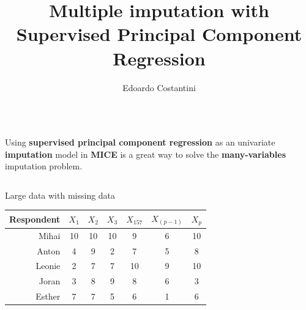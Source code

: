 \documentclass{beamer}\usepackage[]{graphicx}\usepackage[]{xcolor}
\author[e.costantini@tilburgunviersity.com]{Edoardo Costantini}
\title{Multiple imputation with Supervised Principal Component Regression}
\institute{Tilburg University}
\newenvironment{knitrout}{}{} %
\begin{document}


\begin{frame}[fragile]\centering


\begin{columns}
  \begin{column}{.92\textwidth}

    \begin{block}{}
      Using \textbf{supervised principal component regression} as an univariate \textbf{imputation} model in \textbf{MICE} is a great way to solve the \textbf{many-variables} imputation problem.
      \end{block}
    
  \end{column}  
  \end{columns}

  \bigskip
  {\hrulefill}
  \bigskip


\begin{columns}[T]

\begin{column}{.46\textwidth}

\begin{block}{Large data with missing data}
\begin{knitrout}
\color{fgcolor}\begin{table}
\centering
\begin{tabular}[t]{rcccccc}
\toprule
Respondent & $X_1$ & $X_2$ & $X_3$ & $X_{157}$ & $X_{(p-1)}$ & $X_p$\\
\midrule
Mihai & 10 & 10 & 10 & 9 & 6 & 10\\
Anton & 4 & 9 & 2 & 7 & 5 & 8\\
Leonie & 2 & 7 & 7 & 10 & 9 & 10\\
Joran & 3 & 8 & 9 & 8 & 6 & 3\\
Esther & 7 & 7 & 5 & 6 & 1 & 6\\
\bottomrule
\end{tabular}
\end{table}

\end{knitrout}
  \end{block}

\end{column}
\end{columns}


\end{frame}
\end{document}
